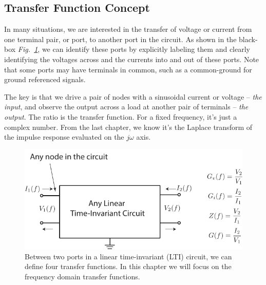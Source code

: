 \subsection{Transfer Function Concept}
In many situations, we are interested in the transfer of voltage or current from one terminal pair, or port, to another port in the circuit.  As shown in the black-box \emph{Fig.~\ref{fig:blackboxltiports}}, we can identify these ports by explicitly labeling them and clearly identifying the voltages across and the currents into and out of these ports.  Note that some ports may have terminals in common, such as a common-ground for ground referenced signals.  

The key is that we drive a pair of nodes with a sinusoidal current or voltage -- \textit{the input}, and observe the output across a load at another pair of terminals -- \textit{the output}.  The ratio is the transfer function.  For a fixed frequency, it’s just a complex number.  From the last chapter, we know it's the  Laplace transform of the impulse response evaluated on the $j\omega$ axis.
\begin{figure}[tb]
\centering
\includegraphics[scale=1]{transfer_func}
\caption{Between two ports in a linear time-invariant (LTI) circuit, we can define four transfer functions.  In this chapter we will focus on the frequency domain transfer functions.}
\label{fig:blackboxltiports}
\end{figure}
